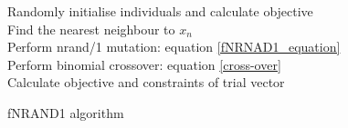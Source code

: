 \begin{algorithm}
\SetAlgoNoLine
 Randomly initialise individuals and calculate objective\\
 {
  {
  Find the nearest neighbour to $x_n$\\
  Perform nrand/1 mutation: equation \ref{fNRNAD1_equation}\\
  Perform binomial crossover: equation \ref{cross-over}\\
  Calculate objective and constraints of trial vector
  }
 }
 \caption{fNRAND1 algorithm}
 \label{fNRAND1 algorithm}
\end{algorithm}